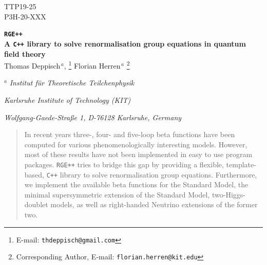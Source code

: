 \documentclass[11pt,a4paper]{article}
\begin{document}
\lstset{style=cpp}

\begin{titlepage}

\vspace*{-15mm}
\begin{flushright}
TTP19-25\\
P3H-20-XXX
\end{flushright}
\vspace*{0.7cm}


\begin{center}
{ \bf\LARGE \texttt{RGE++}\\ A \texttt{C++} library to solve renormalisation group equations in quantum field theory}
\\[8mm]
Thomas Deppisch$^{\, a}$, \footnote{E-mail: \texttt{thdeppisch@gmail.com}} 
Florian Herren$^{\, a}$ \footnote{Corresponding Author, E-mail: \texttt{florian.herren@kit.edu}}
\\[1mm]
\end{center}
\vspace*{0.50cm}
\centerline{$^{a}$ \it Institut f\"ur Theoretische Teilchenphysik}
\centerline{\it Karlsruhe Institute of Technology (KIT)}
\centerline{\it Wolfgang-Gaede-Stra\ss{}e 1, D-76128 Karlsruhe, Germany}
\vspace*{0.2cm}

\begin{abstract}
In recent years three-, four- and five-loop beta functions have been computed for various phenomenologically interesting models.
However, most of these results have not been implemented in easy to use program packages. \texttt{RGE++} tries
to bridge this gap by providing a flexible, template-based, \texttt{C++} library to solve renormalisation group equations.
Furthermore, we implement the available beta functions for the Standard Model, the minimal supersymmetric
extension of the Standard Model, two-Higgs-doublet models, as well as right-handed Neutrino extensions of the former two.
\end{abstract}

\end{titlepage}

\setcounter{footnote}{0}
\end{document}
